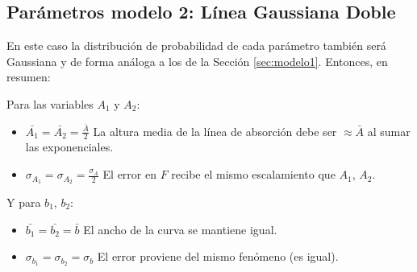 \documentclass{article}
\begin{document}
\subsection{Parámetros modelo 2: Línea Gaussiana Doble}
\label{sec:modelo2}
En este caso la distribución de probabilidad de cada parámetro también será Gaussiana y de forma análoga a los de la Sección \ref{sec:modelo1}. Entonces, en resumen:

Para las variables $A_1$ y $A_2$:
\begin{itemize}
  \item $\bar{A_1} = \bar{A_2} = \frac{\bar{A}}{2}$ La altura media de la línea de absorción debe ser $\approx \bar{A}$ al sumar las exponenciales.
  
  \item $\sigma_{A_1} = \sigma_{A_2} = \frac{\sigma_A}{2}$ El error en $F$ recibe el mismo escalamiento que $A_1$, $A_2$.
\end{itemize}

Y para $b_1$, $b_2$:

\begin{itemize}
  \item $\bar{b_1} = \bar{b_2} = \bar{b}$ El ancho de la curva se mantiene igual.
  
  \item $\sigma_{b_1} = \sigma_{b_2} = \sigma_b$ El error proviene del mismo fenómeno (es igual).
\end{itemize}
\end{document}
